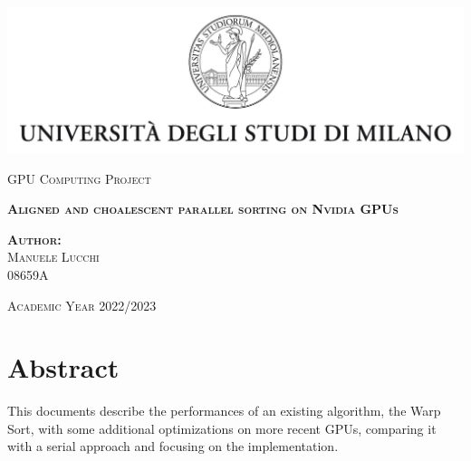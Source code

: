 \documentclass[a4paper, 12pt, oneside]{article}
\begin{document}
\begin{titlepage} %

  \begin{center}
    \includegraphics{logo/logo.jpg}\par
    \vspace{1cm}
    {\scshape\large GPU Computing Project\par}
    \vspace{4cm}
    {\scshape\large\bfseries Aligned and choalescent parallel sorting on Nvidia GPUs\par}
    \vspace{4cm}
  \end{center}

  \begin{center}
    \scshape\normalsize\textbf{Author:}\\Manuele Lucchi\\08659A \par
  \end{center}

  \vfill

  {\begin{center}
      \scshape\large Academic Year 2022/2023
    \end{center}}

\end{titlepage}

\section{Abstract}
This documents describe the performances of an existing algorithm, the Warp Sort, with some additional optimizations on more recent GPUs, comparing it with a serial approach and focusing on the implementation.

\tableofcontents
\end{document}
